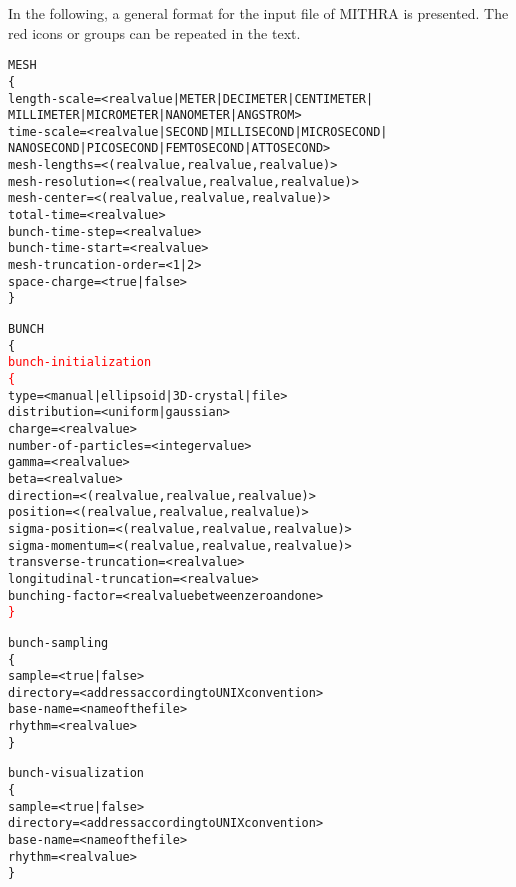 \documentclass[a4paper]{article}
\begin{document}
%
In the following, a general format for the input file of MITHRA is presented. The red icons or groups can be repeated in the text. 

\begin{alltt}
MESH
\{
\tabto{0.3cm}length-scale \tabto{6cm} = < real value | METER | DECIMETER | CENTIMETER | 
\tabto{6.3cm}MILLIMETER | MICROMETER | NANOMETER | ANGSTROM >
\tabto{0.3cm}time-scale  \tabto{6cm} = < real value | SECOND | MILLISECOND | MICROSECOND | 
\tabto{6.3cm}NANOSECOND | PICOSECOND | FEMTOSECOND | ATTOSECOND >
\tabto{0.3cm}mesh-lengths \tabto{6cm} = < ( real value,  real value, real value) >
\tabto{0.3cm}mesh-resolution  \tabto{6cm} = < ( real value,  real value, real value) >
\tabto{0.3cm}mesh-center  \tabto{6cm} = < ( real value,  real value, real value) >
\tabto{0.3cm}total-time \tabto{6cm} = < real value >
\tabto{0.3cm}bunch-time-step  \tabto{6cm} = < real value >
\tabto{0.3cm}bunch-time-start \tabto{6cm} = < real value >
\tabto{0.3cm}mesh-truncation-order \tabto{6cm} = < 1 | 2 >
\tabto{0.3cm}space-charge \tabto{6cm} = < true | false >
\}

BUNCH
\{
\tabto{0.3cm}\textcolor{red}{bunch-initialization}
\tabto{0.3cm}\textcolor{red}{\{}
\tabto{0.6cm}type \tabto{6cm} = < manual | ellipsoid | 3D-crystal | file >
\tabto{0.6cm}distribution \tabto{6cm} = < uniform | gaussian >
\tabto{0.6cm}charge \tabto{6cm} = < real value >
\tabto{0.6cm}number-of-particles \tabto{6cm} = < integer value >
\tabto{0.6cm}gamma \tabto{6cm} = < real value >
\tabto{0.6cm}beta \tabto{6cm} = < real value >
\tabto{0.6cm}direction \tabto{6cm} = < ( real value, real value, real value ) >
\tabto{0.6cm}position \tabto{6cm} = < ( real value, real value, real value ) >
\tabto{0.6cm}sigma-position \tabto{6cm} = < ( real value, real value, real value ) >
\tabto{0.6cm}sigma-momentum \tabto{6cm} = < ( real value, real value, real value ) >
\tabto{0.6cm}transverse-truncation \tabto{6cm} = < real value >
\tabto{0.6cm}longitudinal-truncation \tabto{6cm} = < real value >
\tabto{0.6cm}bunching-factor \tabto{6cm} = < real value between zero and one >
\tabto{0.3cm}\textcolor{red}{\}}

\tabto{0.3cm}bunch-sampling
\tabto{0.3cm}\{
\tabto{0.6cm}sample \tabto{6cm} = < true | false >
\tabto{0.6cm}directory \tabto{6cm} = < address according to UNIX convention >
\tabto{0.6cm}base-name \tabto{6cm} = < name of the file >
\tabto{0.6cm}rhythm \tabto{6cm} = < real value >
\tabto{0.3cm}\}

\tabto{0.3cm}bunch-visualization
\tabto{0.3cm}\{
\tabto{0.6cm}sample \tabto{6cm} = < true | false >
\tabto{0.6cm}directory \tabto{6cm} = < address according to UNIX convention >
\tabto{0.6cm}base-name \tabto{6cm} = < name of the file >
\tabto{0.6cm}rhythm \tabto{6cm} = < real value >
\tabto{0.3cm}\}


\end{alltt}
\end{document}

